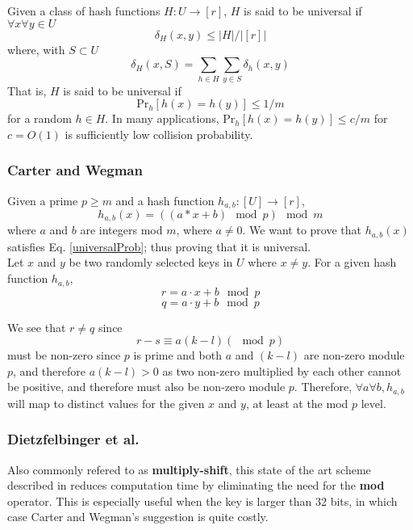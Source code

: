 \documentclass[../../main.tex]{subfiles}
\begin{document}
\noindent Given a class of hash functions $H:U\rightarrow [r]$, $H$ is said to be universal if $\forall x \forall y \in U$
$$
	\delta_H (x,y) \leq |H|/|[r]|
$$
where, with $S\subset U$
$$
\delta_H (x,S) = \sum_{h\in H}\sum_{y\in S} \delta_h(x,y)
$$
That is, $H$ is said to be universal if 
\begin{equation}\label{universalProb}
\mathrm{Pr}_h[h(x)=h(y)]\leq 1/m
\end{equation}
for a random $h \in H$.
 In many applications, Pr$_h[h(x)=h(y)]\leq c/m$ for $c=O(1)$ is sufficiently low collision probability.

\subsubsection*{Carter and Wegman\cite{carterWegman}}
Given a prime $p\geq m$ and a hash function $h_{a,b}:[U]\rightarrow [r]$,
\begin{equation}\label{carterhash}
h_{a,b}(x)=((a*x + b) \mod p) \mod m
\end{equation}
where $a$ and $b$ are integers mod $m$, where $a\neq 0$. We want to prove that $h_{a,b}(x)$ satisfies Eq. \ref{universalProb}; thus proving that it is universal.\\

\noindent Let $x$ and $y$ be two randomly selected keys in $U$ where $x\neq y$. For a given hash function $h_{a,b}$,
$$
r = a\cdot x + b \mod p
$$
$$
q = a \cdot y + b \mod p
$$

\noindent We see that $r\neq q$ since 
$$
r - s \equiv a(k-l) (\mod p)
$$
must be non-zero since $p$ is prime and both $a$ and $(k-l)$ are non-zero module $p$, and therefore $a(k-l) > 0$ as two non-zero multiplied by each other cannot be positive, and therefore must also be non-zero module $p$.
Therefore, $\forall a\forall b, h_{a,b}$ will map to distinct values for the given $x$ and $y$, at least at the mod $p$ level.\\



\subsubsection*{Dietzfelbinger et al.\cite{Dietzfelbinger}}
Also commonly refered to as \textbf{multiply-shift}, this state of the art scheme described in \cite{Dietzfelbinger} reduces computation time by eliminating the need for the \textbf{mod} operator. This is especially useful when the key is larger than 32 bits, in which case Carter and Wegman's suggestion is quite costly\cite{dikuHash}.\\
\end{document}

